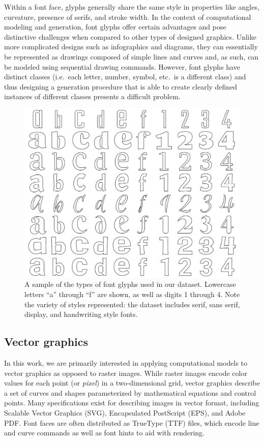 Within a font face, glyphs generally share the same style in properties like angles, curvature, presence of serifs, and stroke width.
In the context of computational modeling and generation, font glyphs offer certain advantages and pose distinctive challenges when compared to other types of designed graphics.
Unlike more complicated designs such as infographics and diagrams, they can essentially be represented as drawings composed of simple lines and curves and, as such, can be modeled using sequential drawing commands.
However, font glyphs have distinct classes (i.e.\ each letter, number, symbol, etc.\ is a different class) and thus designing a generation procedure that is able to create clearly defined instances of different classes presents a difficult problem.

\begin{figure}[]
	\includegraphics[width=\textwidth]{figures/input_fonts}
    \caption[A sample of the types of font faces used in our fonts dataset]{A sample of the types of font glyphs used in our dataset. Lowercase letters ``a'' through ``f'' are shown, as well as digits 1 through 4. Note the variety of styles represented: the dataset includes serif, sans serif, display, and handwriting style fonts.\label{fig:input_fonts}}
\end{figure}

\subsection{Vector graphics}
In this work, we are primarily interested in applying computational models to vector graphics as opposed to raster images.
While raster images encode color values for each point (or \textit{pixel}) in a two-dimensional grid, vector graphics describe a set of curves and shapes parameterized by mathematical equations and control points.
Many specifications exist for describing images in vector format, including Scalable Vector Graphics (SVG), Encapsulated PostScript (EPS), and Adobe PDF\@.
Font faces are often distributed as TrueType (TTF) files, which encode line and curve commands as well as font hints to aid with rendering.

